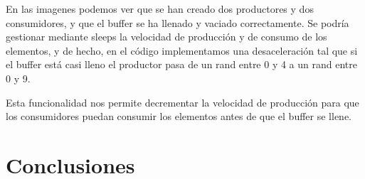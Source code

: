 \documentclass[twocolumn]{article}
\begin{document}
En las imagenes podemos ver que se han creado dos productores y dos consumidores, y que el buffer se ha llenado y vaciado correctamente. Se podría gestionar mediante sleeps la velocidad de producción y de consumo de los elementos, y de hecho, en el código implementamos una desaceleración tal que si el buffer está casi lleno el productor pasa de un rand entre 0 y 4 a un rand entre 0 y 9. 

Esta funcionalidad nos permite decrementar la velocidad de producción para que los consumidores puedan consumir los elementos antes de que el buffer se llene.
\section{Conclusiones}
\lipsum[7-8] %
\end{document}
